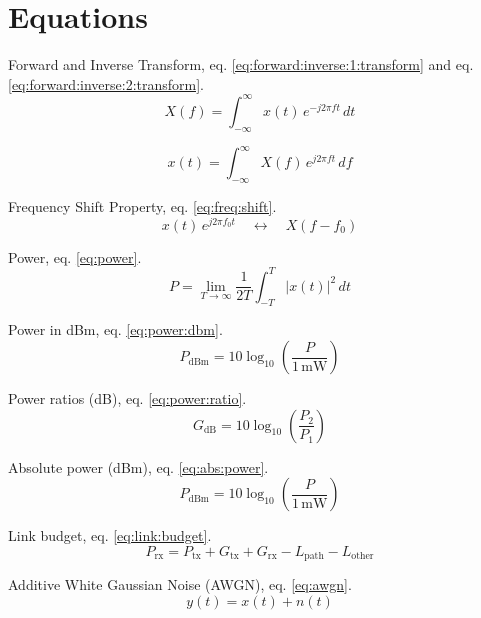 \section{Equations}
Forward and Inverse Transform, eq. \ref{eq:forward:inverse:1:transform} and eq. \ref{eq:forward:inverse:2:transform}.
\begin{equation}
  \label{eq:forward:inverse:1:transform}
  X(f) = \int_{-\infty}^{\infty} x(t) \, e^{-j2\pi f t} \, dt
\end{equation}

\begin{equation}
  \label{eq:forward:inverse:2:transform}
  x(t) = \int_{-\infty}^{\infty} X(f) \, e^{j2\pi f t} \, df
\end{equation}

Frequency Shift Property, eq. \ref{eq:freq:shift}.
\begin{equation}
  \label{eq:freq:shift}
  x(t) \, e^{j2\pi f_0 t} \quad \longleftrightarrow \quad X(f - f_0)
\end{equation}

Power, eq. \ref{eq:power}.
\begin{equation}
  \label{eq:power}
 P = \lim_{T \to \infty} \frac{1}{2T} \int_{-T}^{T} |x(t)|^2 \, dt
\end{equation}

Power in dBm, eq. \ref{eq:power:dbm}.
\begin{equation}
  \label{eq:power:dbm}
  P_{\text{dBm}} = 10 \log_{10}\left( \frac{P}{1\,\text{mW}} \right)
\end{equation}

Power ratios (dB), eq. \ref{eq:power:ratio}.
\begin{equation}
  \label{eq:power:ratio}
  G_{\text{dB}} = 10 \log_{10}\left( \frac{P_2}{P_1} \right)
\end{equation}

Absolute power (dBm), eq. \ref{eq:abs:power}.
\begin{equation}
  \label{eq:abs:power}
  P_{\text{dBm}} = 10 \log_{10}\left( \frac{P}{1\,\text{mW}} \right)
\end{equation}

Link budget, eq. \ref{eq:link:budget}.
\begin{equation}
  \label{eq:link:budget}
  P_{\text{rx}} = P_{\text{tx}} + G_{\text{tx}} + G_{\text{rx}} - L_{\text{path}} - L_{\text{other}}
\end{equation}

Additive White Gaussian Noise (AWGN), eq. \ref{eq:awgn}.
\begin{equation}
  \label{eq:awgn}
  y(t) = x(t) + n(t)
\end{equation}

